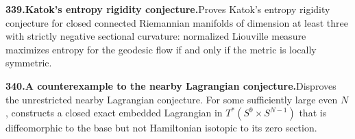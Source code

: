 \documentclass[11pt,a4paper]{article}
\begin{document}
  \par \begin{minipage}{\linewidth}
  \fontsize{10.5}{12.6}\selectfont\RaggedRight
  \hypertarget{result 339}{}
  {\bfseries\textcolor{muted}{339.}\enspace Katok's entropy rigidity conjecture.}\enspace Proves Katok's entropy rigidity conjecture for closed connected Riemannian manifolds of dimension at least three with strictly negative sectional curvature: normalized Liouville measure maximizes entropy for the geodesic flow if and only if the metric is locally symmetric.\par
  \end{minipage}\par\vspace{5pt}



  \par \begin{minipage}{\linewidth}
  \fontsize{10.5}{12.6}\selectfont\RaggedRight
  \hypertarget{result 340}{}
  {\bfseries\textcolor{muted}{340.}\enspace A counterexample to the nearby Lagrangian conjecture.}\enspace Disproves the unrestricted nearby Lagrangian conjecture. For some sufficiently large even $N$, constructs a closed exact embedded Lagrangian in $T^*(S^9\times S^{N-1})$ that is diffeomorphic to the base but not Hamiltonian isotopic to its zero section.\par
  \end{minipage}\par\vspace{5pt}
\end{document}
